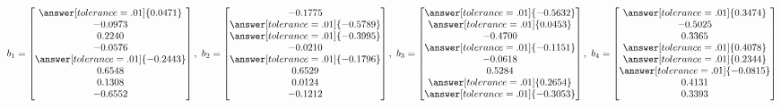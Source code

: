\documentclass{ximera}
\begin{document}
\begin{example}
\begin{enumerate}
\[
b_1 = \begin{bmatrix} 
    \answer[tolerance=.01]{0.0471} \\ 
-0.0973 \\ 
0.2240 \\ 
-0.0576 \\ 
\answer[tolerance=.01]{-0.2443} \\ 
0.6548 \\ 
0.1308 \\ 
-0.6552 
\end{bmatrix}, \quad
b_2 = \begin{bmatrix} 
-0.1775 \\ 
\answer[tolerance=.01]{-0.5789} \\ 
\answer[tolerance=.01]{-0.3995} \\ 
-0.0210 \\ 
\answer[tolerance=.01]{-0.1796} \\ 
0.6529 \\ 
0.0124 \\ 
-0.1212 
\end{bmatrix}, \quad
b_3 = \begin{bmatrix} 
\answer[tolerance=.01]{-0.5632} \\ 
\answer[tolerance=.01]{0.0453} \\ 
-0.4700 \\ 
\answer[tolerance=.01]{-0.1151} \\ 
-0.0618 \\ 
0.5284 \\ 
\answer[tolerance=.01]{0.2654} \\ 
\answer[tolerance=.01]{-0.3053} 
\end{bmatrix}, \quad
b_4 = \begin{bmatrix} 
\answer[tolerance=.01]{0.3474} \\ 
-0.5025 \\ 
0.3365 \\ 
\answer[tolerance=.01]{0.4078} \\ 
\answer[tolerance=.01]{0.2344} \\ 
\answer[tolerance=.01]{-0.0815} \\ 
0.4131 \\ 
0.3393 
\end{bmatrix}
\]


\end{enumerate}

\end{example}
\end{document}
